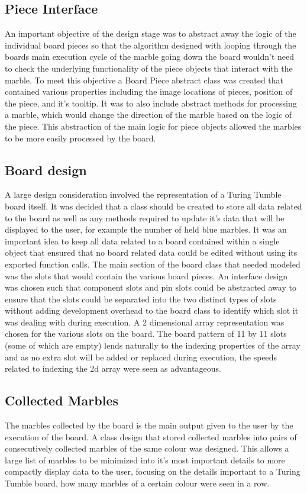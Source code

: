 \documentclass{l4proj}
\begin{document}
\subsection{Piece Interface}
An important objective of the design stage was to abstract away the logic of the individual board pieces so that the algorithm designed with looping through the boards main execution cycle of the marble going down the board wouldn't need to check the underlying functionality of the piece objects that interact with the marble. To meet this objective a Board Piece abstract class was created that contained various properties including the image locations of pieces, position of the piece, and it's tooltip. It was to also include abstract methods for processing a marble, which would change the direction of the marble based on the logic of the piece. This abstraction of the main logic for piece objects allowed the marbles to be more easily processed by the board.

\subsection{Board design}
A large design consideration involved the representation of a Turing Tumble board itself. It was decided that a class should be created to store all data related to the board as well as any methods required to update it's data that will be displayed to the user, for example the number of held blue marbles. It was an important idea to keep all data related to a board contained within a single object that ensured that no board related data could be edited without using its exported function calls. The main section of the board class that needed modeled was the slots that would contain the various board pieces. An interface design was chosen such that component slots and pin slots could be abstracted away to ensure that the slots could be separated into the two distinct types of slots without adding development overhead to the board class to identify which slot it was dealing with during execution. A 2 dimensional array representation was chosen for the various slots on the board. The board pattern of 11 by 11 slots (some of which are empty) lends naturally to the indexing properties of the array and as no extra slot will be added or replaced during execution, the speeds related to indexing the 2d array were seen as advantageous. 

\subsection{Collected Marbles}
The marbles collected by the board is the main output given to the user by the execution of the board. A class design that stored collected marbles into pairs of consecutively collected marbles of the same colour was designed. This allows a large list of marbles to be minimized into it's most important details to more compactly display data to the user, focusing on the details important to a Turing Tumble board, how many marbles of a certain colour were seen in a row. 
\end{document}
